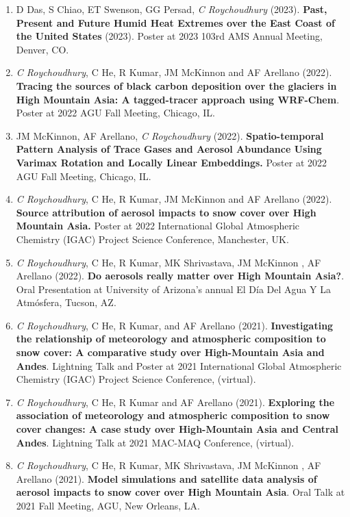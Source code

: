 \documentclass[margin,line]{resume}
\begin{document}
\begin{resume}
\begin{enumerate}[topsep=1pt, partopsep=1pt, itemsep=0.5pt, parsep=0.1pt, leftmargin=15pt,label=\arabic*.]
			\item D Das, S Chiao, ET Swenson, GG Persad, \textit{C Roychoudhury} (2023). \textbf{Past, Present and Future Humid Heat Extremes over the East Coast of the United States} (2023). Poster at 2023 103rd AMS Annual Meeting, Denver, CO. 
			
			\item \textit{C Roychoudhury}, C He, R Kumar, JM McKinnon and AF Arellano (2022).
			\textbf{Tracing the sources of black carbon deposition over the glaciers in High Mountain Asia: A tagged-tracer approach using WRF-Chem}. Poster at 2022 AGU Fall Meeting, Chicago, IL.
			
			\item JM McKinnon, AF Arellano, \textit{C Roychoudhury} (2022). \textbf{Spatio-temporal Pattern Analysis of Trace Gases and Aerosol Abundance Using Varimax Rotation and Locally Linear Embeddings.} Poster at 2022 AGU Fall Meeting, Chicago, IL.
			
			\item \textit{C Roychoudhury}, C He, R Kumar, JM McKinnon and AF Arellano (2022). 
			\textbf{Source attribution of aerosol impacts to snow cover over High Mountain Asia.} Poster at 2022 International Global Atmospheric Chemistry (IGAC) Project Science Conference, Manchester, UK.
			
			\item \textit{C Roychoudhury}, C He, R Kumar, MK Shrivastava, JM McKinnon , AF Arellano (2022).
			\textbf{Do aerosols really matter over High Mountain Asia?}.
			Oral Presentation at University of Arizona's annual El Día Del Agua Y La Atmósfera, Tucson, AZ.
			
			\item \textit{C Roychoudhury}, C He, R Kumar, and AF Arellano (2021).
			\textbf{Investigating the relationship of meteorology and atmospheric composition to snow cover: A comparative study over High-Mountain Asia and Andes}.
			Lightning Talk and Poster at 2021 International Global Atmospheric Chemistry (IGAC) Project Science Conference, (virtual).
			
			\item \textit{C Roychoudhury}, C He, R Kumar and AF Arellano (2021).
		\textbf{Exploring the association of meteorology and atmospheric composition to snow cover changes: A case study over High-Mountain Asia and Central Andes}. 
	Lightning Talk at 2021 MAC-MAQ Conference, (virtual).
			
			\item \textit{C Roychoudhury}, C He, R Kumar, MK Shrivastava, JM McKinnon , AF Arellano (2021). 
			\textbf{Model simulations and satellite data analysis of aerosol impacts to snow cover over High Mountain Asia}. 
			Oral Talk at 2021 Fall Meeting, AGU, New Orleans, LA.
			

\end{enumerate}
\end{resume}
\end{document}
